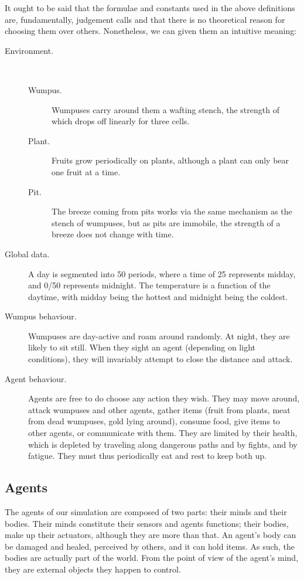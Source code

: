 It ought to be said that the formulae and constants used in the above definitions are, fundamentally, judgement calls and that there is no theoretical reason for choosing them over others. Nonetheless, we can given them an intuitive meaning:
\begin{description}
	\item[Environment.]\ 
	\begin{description}
		\item[Wumpus.] Wumpuses carry around them a wafting stench, the strength of which drops off linearly for three cells.
		\item[Plant.] Fruits grow periodically on plants, although a plant can only bear one fruit at a time.
		\item[Pit.] The breeze coming from pits works via the same mechanism as the stench of wumpuses, but as pits are immobile, the strength of a breeze does not change with time.
	\end{description}
	\item[Global data.] A day is segmented into 50 periods, where a time of 25 represents midday, and 0/50 represents midnight. The temperature is a function of the daytime, with midday being the hottest and midnight being the coldest.
	\item[Wumpus behaviour.] Wumpuses are day-active and roam around randomly. At night, they are likely to sit still. When they sight an agent (depending on light conditions), they will invariably attempt to close the distance and attack.
	\item[Agent behaviour.] Agents are free to do choose any action they wish. They may move around, attack wumpuses and other agents, gather items (fruit from plants, meat from dead wumpuses, gold lying around), consume food, give items to other agents, or communicate with them. They are limited by their health, which is depleted by traveling along dangerous paths and by fights, and by fatigue. They must thus periodically eat and rest to keep both up. 
\end{description}

\subsection{Agents}

The agents of our simulation are composed of two parts: their minds and their bodies. Their minds constitute their sensors and agents functions; their bodies, make up their actuators, although they are more than that. An agent's body can be damaged and healed, perceived by others, and it can hold items. As such, the bodies are actually part of the world. From the point of view of the agent's mind, they are external objects they happen to control.

